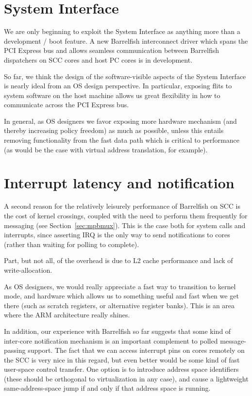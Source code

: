 \documentclass[a4paper,twoside]{report} %
\begin{document}
\section{System Interface}

We are only beginning to exploit the System Interface as anything 
more than a development / boot feature.  A new Barrelfish interconnect
driver which spans the PCI Express bus and allows seamless communication
between Barrelfish dispatchers on SCC cores and host PC cores is in
development. 

So far, we think the design of the software-visible aspects of the
System Interface is nearly ideal from an OS design perspective.
In particular, exposing flits to system software on the host machine
allows us great  flexibility in how to communicate across the PCI
Express bus. 

In general, as OS designers we favor exposing more hardware mechanism (and
thereby increasing policy freedom) as much as possible, unless this
entails removing functionality from the fast data path which is
critical to performance (as would be the case with virtual address
translation, for example). 

\section{Interrupt latency and notification}

A second reason for the relatively leisurely performance of Barrelfish
on SCC is the cost of kernel crossings, coupled with the need to
perform them frequently for messaging (see Section~\ref{sec:mpbmux}).
This is the case both for system calls and interrupts, since asserting
IRQ is the only way to send notifications to cores (rather than
waiting for polling to complete). 

Part, but not all, of the overhead is due to L2 cache performance and
lack of write-allocation.  

As OS designers, we would really appreciate a fast way to transition
to kernel mode, and hardware which allows us to something useful and
fast when we get there (such as scratch registers, or alternative
register banks).  This is an area where the ARM architecture really
shines. 

In addition, our experience with Barrelfish so far suggests that some
kind of inter-core notification mechanism is an important complement
to polled message-passing support.  The fact that we can access
interrupt pins on cores remotely on the SCC is very nice in this
regard, but even better would be some kind of fast user-space control
transfer.  One option is to introduce address space identifiers (these
should be orthogonal to virtualization in any case), and cause a
lightweight same-address-space jump if and only if that address space
is running. 
\end{document}
